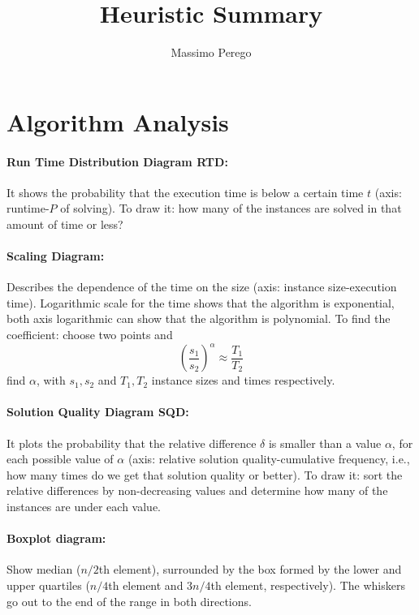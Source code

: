 \documentclass{article}
\title{Heuristic Summary}
\author{Massimo Perego}
\date{}
\begin{document}
	
	\maketitle
	
	\section*{Algorithm Analysis}
	
	\paragraph{Run Time Distribution Diagram RTD:} It shows the probability that the execution time is below a certain time $t$ (axis: runtime-$P$ of solving). To draw it: how many of the instances are solved in that amount of time or less?\\
	
	\paragraph{Scaling Diagram:} Describes the dependence of the time on the size (axis: instance size-execution time). Logarithmic scale for the time shows that the algorithm is exponential, both axis logarithmic can show that the algorithm is polynomial. To find the coefficient: choose two points and 
	$$ \left(\frac{s_1}{s_2}\right)^\alpha \approx \frac{T_1}{T_2}$$
	find $\alpha$, with $s_1, s_2$ and $T_1, T_2$ instance sizes and times respectively.\\
	
	\paragraph{Solution Quality Diagram SQD:} It plots the probability that the relative difference $\delta$ is smaller than a value $\alpha$, for each possible value of $\alpha$ (axis: relative solution quality-cumulative frequency, i.e., how many times do we get that solution quality or better). To draw it: sort the relative differences by non-decreasing values and determine how many of the instances are under each value.\\
	
	\paragraph{Boxplot diagram:} Show median ($n/2$th element), surrounded by the box formed by the lower and upper quartiles ($n/4$th element and $3n/4$th element, respectively). The whiskers go out to the end of the range in both directions.\\
	
\end{document}

